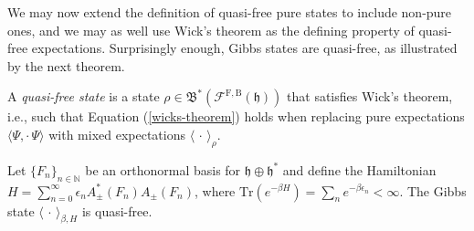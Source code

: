 We may now extend the definition of quasi-free pure states to include non-pure ones, and we
may as well use Wick's theorem as the defining property of quasi-free expectations.
Surprisingly enough, Gibbs states are quasi-free, as illustrated by the next theorem.

\begin{definition}
	A \textit{quasi-free state} is a state $\rho\in\mathfrak{B}^*(\mathcal{F}^{
	\mathrm{F,B}}(\mathfrak{h}))$ that satisfies Wick's theorem, i.e., such that Equation
	(\ref{wicks-theorem}) holds when replacing pure expectations $\langle\Psi,\cdot\,\Psi\rangle$
	with mixed expectations $\langle\,\cdot\,\rangle_\rho$.
\end{definition}

\begin{theorem}
	\label{mixed-quasi-free-wick}
	Let $\{F_n\}_{n\in\mathbb{N}}$ be an orthonormal basis for $\mathfrak{h}\oplus\mathfrak{h}^*$
	and define the Hamiltonian $H=\sum_{n=0}^\infty\epsilon_nA^*_\pm(F_n)A_\pm(F_n)$, where
	$\mathrm{Tr}(e^{-\beta H})=\sum_ne^{-\beta\epsilon_n}<\infty$. The Gibbs state
	$\langle\,\cdot\,\rangle_{\beta,H}$ is quasi-free.
\end{theorem}
